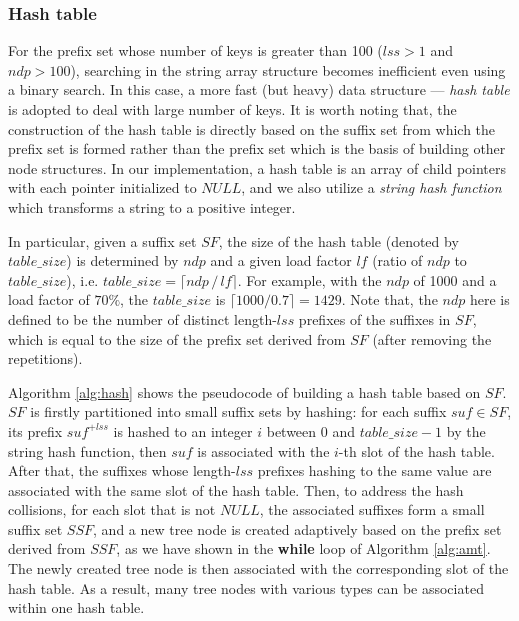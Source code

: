 \subsubsection{Hash table}
\label{sec:hash table}

For the prefix set whose number of keys is greater than 100 ($lss > 1$
and $ndp > 100$), searching in the string array structure becomes
inefficient even using a binary search. In this case, a more fast (but
heavy) data structure --- \emph{hash table} is adopted to deal with
large number of keys. It is worth noting that, the construction of the
hash table is directly based on the suffix set from which the prefix
set is formed rather than the prefix set which is the basis of
building other node structures. In our implementation, a hash table is
an array of child pointers with each pointer initialized to $NULL$,
and we also utilize a \emph{string hash function} which transforms a
string to a positive integer.


In particular, given a suffix set $SF$, the size of the hash table
(denoted by $table\_size$) is determined by $ndp$ and a given load
factor $lf$ (ratio of $ndp$ to $table\_size$), i.e.
$table\_size = \lceil ndp\,/\,lf \rceil$. For example, with the $ndp$
of 1000 and a load factor of $70\%$, the $table\_size$ is
$\lceil 1000/0.7 \rceil = 1429$. Note that, the $ndp$ here is defined
to be the number of distinct length-$lss$ prefixes of the suffixes in
$SF$, which is equal to the size of the prefix set derived from $SF$
(after removing the repetitions).

Algorithm \ref{alg:hash} shows the pseudocode of building a hash table
based on $SF$. $SF$ is firstly partitioned into small suffix sets by
hashing: for each suffix $suf \in SF$, its prefix $suf^{+lss}$ is
hashed to an integer $i$ between 0 and $table\_size-1$ by the string
hash function, then $suf$ is associated with the $i$-th slot of the
hash table. After that, the suffixes whose length-$lss$ prefixes
hashing to the same value are associated with the same slot of the
hash table. Then, to address the hash collisions, for each slot that
is not $NULL$, the associated suffixes form a small suffix set $SSF$,
and a new tree node is created adaptively based on the prefix set
derived from $SSF$, as we have shown in the \textbf{while} loop of
Algorithm \ref{alg:amt}. The newly created tree node is then
associated with the corresponding slot of the hash table. As a result,
many tree nodes with various types can be associated within one hash
table.

